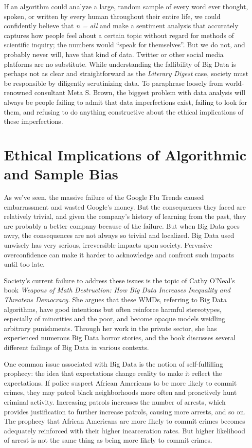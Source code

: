 \documentclass[sigconf]{acmart}
\begin{document}
If an algorithm could analyze a large, random sample of every word ever thought, spoken, or written by every human throughout their entire life, we could confidently believe that {\em n = all} and make a sentiment analysis that accurately captures how people feel about a certain topic without regard for methods of scientific inquiry; the numbers would ``speak for themselves''\cite{Anderson2008}. But we do not, and probably never will, have that kind of data. Twitter or other social media platforms are no substitute. While understanding the fallibility of Big Data is perhaps not as clear and straightforward as the {\em Literary Digest} case, society must be responsible by diligently scrutinizing data. To paraphrase loosely from world-renowned consultant Meta S. Brown, the biggest problem with data analysis will always be people failing to admit that data imperfections exist, failing to look for them, and refusing to do anything constructive about the ethical implications of these imperfections\cite{Brown2017}.

\section{Ethical Implications of Algorithmic and Sample Bias}

As we've seen, the massive failure of the Google Flu Trends caused embarrassment and wasted Google's money. But the consequences they faced are relatively trivial, and given the company's history of learning from the past, they are probably a better company because of the failure. But when Big Data goes awry, the consequences are not always so trivial and localized. Big Data used unwisely has very serious, irreversible impacts upon society. Pervasive overconfidence can make it harder to acknowledge and confront such impacts until too late. 

Society's current failure to address these issues is the topic of Cathy O'Neal's book {\em Weapons of Math Destruction: How Big Data Increases Inequality and Threatens Democracy}. She argues that these WMDs, referring to Big Data algorithms, have good intentions but often reinforce harmful stereotypes, especially of minorities and the poor, and become opaque models weidling arbitrary punishments. Through her work in the private sector, she has experienced numerous Big Data horror stories, and the book discusses several different failings of Big Data in various contexts.

One common issue associated with Big Data is the notion of self-fulfilling prophecy: the idea that expectations change reality to make it reflect the expectations. If police suspect African Americans to be more likely to commit crimes, they may patrol black neighborhoods more often and proactively hunt criminal activity. Increasing patrols increases the number of arrests, which provides justification to further increase patrols, causing more arrests, and so on. The prophecy that African Americans are more likely to commit crimes becomes adequately reinforced with their higher incarceration rates. But higher likelihood of arrest is not the same thing as being more likely to commit crimes\cite{Liu2017}.
\end{document}

